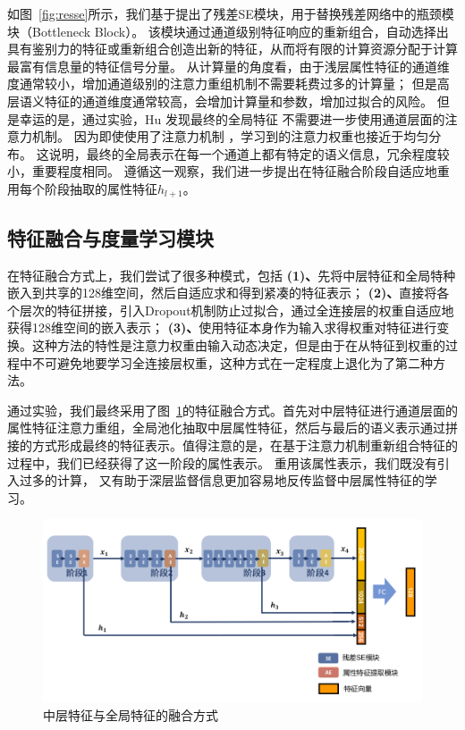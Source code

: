 如图~\ref{fig:resse}所示，我们基于\cite{hu2017senet}提出了残差SE模块，用于替换残差网络中的瓶颈模块（Bottleneck Block）。
该模块通过通道级别特征响应的重新组合，自动选择出具有鉴别力的特征或重新组合创造出新的特征，从而将有限的计算资源分配于计算最富有信息量的特征信号分量。
从计算量的角度看，由于浅层属性特征的通道维度通常较小，增加通道级别的注意力重组机制不需要耗费过多的计算量；
但是高层语义特征的通道维度通常较高，会增加计算量和参数，增加过拟合的风险。
但是幸运的是，通过实验，Hu \etal 发现最终的全局特征
不需要进一步使用通道层面的注意力机制。
因为即使使用了注意力机制
，学习到的注意力权重也接近于均匀分布。
这说明，最终的全局表示在每一个通道上都有特定的语义信息，冗余程度较小，重要程度相同。
遵循这一观察，我们进一步提出在特征融合阶段自适应地重用每个阶段抽取的属性特征$h_{l+1}$。


\subsection{特征融合与度量学习模块}

在特征融合方式上，我们尝试了很多种模式，包括
\textbf{(1)、}先将中层特征和全局特种嵌入到共享的128维空间，然后自适应求和得到紧凑的特征表示；
\textbf{(2)、}直接将各个层次的特征拼接，引入Dropout机制防止过拟合，通过全连接层的权重自适应地获得128维空间的嵌入表示；
\textbf{(3)、}使用特征本身作为输入求得权重对特征进行变换。这种方法的特性是注意力权重由输入动态决定，但是由于在从特征到权重的过程中不可避免地要学习全连接层权重，这种方式在一定程度上退化为了第二种方法。

通过实验，我们最终采用了图~\ref{fig:fusion}的特征融合方式。首先对中层特征进行通道层面的属性特征注意力重组，全局池化抽取中层属性特征，然后与最后的语义表示通过拼接的方式形成最终的特征表示。值得注意的是，在基于注意力机制重新组合特征的过程中，我们已经获得了这一阶段的属性表示。
重用该属性表示，我们既没有引入过多的计算，
又有助于深层监督信息更加容易地反传监督中层属性特征的学习。

\begin{figure}
	\centering
	\includegraphics[width=.9\textwidth]{fig/2018-05-11-16-54-07.png}
	\caption{中层特征与全局特征的融合方式}
	\label{fig:fusion}
\end{figure}

